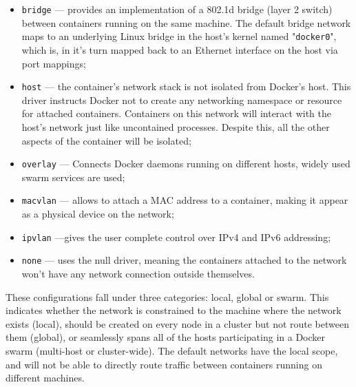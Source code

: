 \begin{itemize}
    \item \texttt{bridge} --- provides an implementation of a 802.1d bridge (layer 2 switch) between containers running on the same machine. The default bridge network maps to an underlying Linux bridge in the host's kernel named "\texttt{docker0}", which is, in it's turn mapped back to an Ethernet interface on the host via port mappings;
    \item \texttt{host} --- the container's network stack is not isolated from Docker's host. This driver instructs Docker not to create any networking namespace or resource for attached containers. Containers on this network will interact with the host's network just like uncontained processes. Despite this, all the other aspects of the container will be isolated;
    \item \texttt{overlay} --- Connects Docker daemons running on different hosts, widely used swarm services are used;
    \item \texttt{macvlan} --- allows to attach a \acs{MAC} address to a container, making it appear as a physical device on the network;
    \item \texttt{ipvlan} ---gives the user complete control over IPv4 and IPv6 addressing;
    \item \texttt{none} --- uses the null driver, meaning the containers attached to the network won't have any network connection outside themselves.
\end{itemize}

These configurations fall under three categories: local, global or swarm. This indicates whether the network is constrained to the machine where the network exists (local), should be created on every node in a cluster but not route between them (global), or seamlessly spans all of the hosts participating in a Docker swarm (multi-host or cluster-wide). The default networks have the local scope, and will not be able to directly route traffic between containers running on different machines.